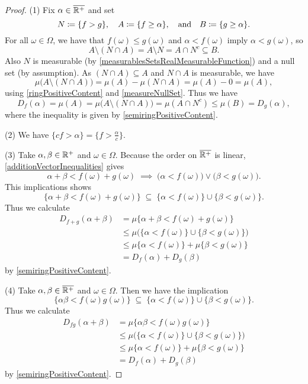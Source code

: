 \begin{proof}
(1) Fix $\alpha\in \overline{\mathbb{R}^+}$ and set
\[ N \coloneqq \{f > g\}, \quad A \coloneqq \{f \geq \alpha\}, \quad\text{and}\quad B \coloneqq \{g \geq \alpha\}. \]
For all $\omega\in\Omega$, we have that $f(\omega)\leq g(\omega)$ and $\alpha < f(\omega)$ imply $\alpha < g(\omega)$, so
\[ A\setminus (N\cap A) = A\setminus N = A\cap N^c \subseteq B. \]
Also $N$ is measurable (by \ref{measurablesSetsRealMeasurableFunction}) and a null set (by assumption). 
As $(N\cap A) \subseteq A$ and $N\cap A$ is measurable, we have \[ \mu\big(A\setminus (N\cap A)\big) = \mu(A) - \mu(N\cap A) = \mu(A) - 0 = \mu(A), \]
using \ref{ringPositiveContent} and \ref{measureNullSet}. Thus we have
\[ D_f(\alpha) = \mu(A) = \mu\big(A\setminus (N\cap A)\big) = \mu(A\cap N^c) \leq \mu(B) = D_g(\alpha), \]
where the inequality is given by \ref{semiringPositiveContent}.

(2) We have $\{cf>\alpha\} = \{f>\frac{\alpha}{c}\}$.

(3) Take $\alpha,\beta\in \mathbb{R}^+$ and $\omega\in \Omega$. 
Because the order on $\overline{\mathbb{R}^+}$ is linear, \ref{additionVectorInequalities} gives
\[ \alpha + \beta < f(\omega) + g(\omega) \;\implies\; \big(\alpha < f(\omega)\big) \lor \big(\beta < g(\omega)\big). \]
This implications shows
\[ \{\alpha + \beta < f(\omega)+g(\omega)\} \;\subseteq\; \{\alpha < f(\omega)\} \cup \{\beta < g(\omega)\}. \]
Thus we calculate
\begin{align*}
D_{f+g}(\alpha+\beta) &= \mu\{\alpha + \beta < f(\omega)+g(\omega)\} \\
&\leq \mu\Big(\{\alpha < f(\omega)\} \cup \{\beta < g(\omega)\}\Big) \\
&\leq \mu\{\alpha < f(\omega)\} + \mu \{\beta < g(\omega)\} \\
&= D_f(\alpha) + D_g(\beta)
\end{align*}
by \ref{semiringPositiveContent}.

(4) Take $\alpha,\beta\in \overline{\mathbb{R}^+}$ and $\omega\in \Omega$. Then we have the implication
\[ \{\alpha\beta < f(\omega)g(\omega)\} \;\subseteq\; \{\alpha < f(\omega)\} \cup \{\beta < g(\omega)\}. \]
Thus we calculate
\begin{align*}
D_{fg}(\alpha+\beta) &= \mu\{\alpha\beta < f(\omega)g(\omega)\} \\
&\leq \mu\Big(\{\alpha < f(\omega)\} \cup \{\beta < g(\omega)\}\Big) \\
&\leq \mu\{\alpha < f(\omega)\} + \mu \{\beta < g(\omega)\} \\
&= D_f(\alpha) + D_g(\beta)
\end{align*}
by \ref{semiringPositiveContent}.
\end{proof}



